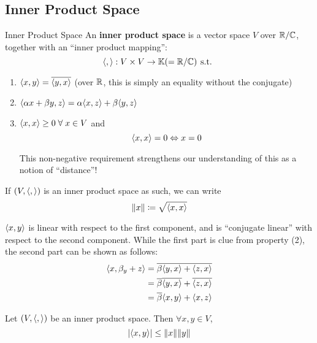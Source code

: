 \subsection{Inner Product Space}
\begin{definition} {Inner Product Space}
    An \textbf{inner product space} is a vector space \(V\) over \(\mathbb{R} / \mathbb{C}\), together with an ``inner product mapping'': \[
        \langle ,  \rangle: V \times V \to \mathbb{K} (= \mathbb{R} / \mathbb{C}) \hspace*{4pt}\text{s.t.}\hspace*{4pt}
    \]
    \begin{enumerate}
        \item \(\langle x, y \rangle = \overline{\langle y, x \rangle}\) (over \(\mathbb{R}\), this is simply an equality without the conjugate)
        \item \(\langle \alpha x + \beta y, z \rangle = \alpha \langle x, z \rangle + \beta \langle y, z \rangle\)
        \item \(\innerproduct{x}{x} \geq 0 \forall x \in V\) and \[
                  \langle x, x \rangle = 0 \Leftrightarrow x = 0
              \]

              This non-negative requirement strengthens our understanding of this as a notion of ``distance''!
    \end{enumerate}
\end{definition}

If \((V, \langle ,  \rangle)\) is an inner product space as such, we can write \[
    \lVert x\rVert \coloneqq \sqrt{\langle x, x \rangle}
\]
\begin{observe}
    \(\langle x, y \rangle\) is linear with respect to the first component, and is ``conjugate linear'' with respect to the second component. While the first part is clue from property (2), the second part can be shown as follows:
    \begin{align*}
        \langle x, \beta_y + z \rangle & = \overline{\beta\langle y, x \rangle + \langle z, x \rangle}                \\
                                      & = \overline{\beta} \overline{\langle y, x \rangle} + \overline{\langle z, x \rangle} \\
                                      & = \overline{\beta} \langle x, y \rangle + \langle x, z \rangle
    \end{align*}
\end{observe}
\begin{lemma} 
    Let \((V, \langle ,  \rangle)\) be an inner product space. Then \(\forall x, y \in V  \), \[
        \lvert\langle x, y \rangle\rvert \leq \lVert x\rVert \lVert y\rVert
    \]
\end{lemma}

